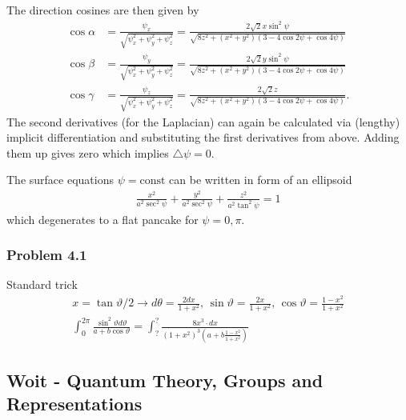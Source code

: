 \documentclass[10pt,a4paper]{book}
\theoremstyle{definition}
\begin{document}
The direction cosines are then given by
\begin{align}
    \cos\alpha&=\frac{\psi_x}{\sqrt{\psi_x^2+\psi_y^2+\psi_z^2}}=\frac{2\sqrt{2}x\sin^2\psi}{\sqrt{8z^2+(x^2+y^2)(3-4\cos2\psi+\cos4\psi)}}\\
    \cos\beta&=\frac{\psi_y}{\sqrt{\psi_x^2+\psi_y^2+\psi_z^2}}=\frac{2\sqrt{2}y\sin^2\psi}{\sqrt{8z^2+(x^2+y^2)(3-4\cos2\psi+\cos4\psi)}}\\
    \cos\gamma&=\frac{\psi_z}{\sqrt{\psi_x^2+\psi_y^2+\psi_z^2}}=\frac{2\sqrt{2}z}{\sqrt{8z^2+(x^2+y^2)(3-4\cos2\psi+\cos4\psi)}}.
\end{align}
The second derivatives (for the Laplacian) can again be calculated via (lengthy) implicit differentiation and substituting the first derivatives from above. Adding them up gives zero which implies $\triangle\psi=0$.

The surface equations $\psi=\text{const}$ can be written in form of an ellipsoid
\begin{align}
    \frac{x^2}{a^2\sec^2\psi}+\frac{y^2}{a^2\sec^2\psi}+\frac{z^2}{a^2\tan^2\psi}=1
\end{align}
which degenerates to a flat pancake for $\psi=0,\pi$.

\subsubsection{Problem 4.1}
Standard trick
\begin{align}
    x=\tan\vartheta/2\rightarrow d\theta =\frac{2dx}{1+x^2},\,\sin\vartheta=\frac{2x}{1+x^2},\,\cos\vartheta=\frac{1-x^2}{1+x^2}\\
    \int_0^{2\pi}\frac{\sin^2\vartheta d\vartheta}{a+b\cos\vartheta}=\int_?^{?}\frac{8x^3\cdot dx}{(1+x^2)^3(a+b\frac{1-x^2}{1+x^2})}
\end{align}

\subsection{{\sc Woit} - Quantum Theory, Groups and Representations}
\end{document}
